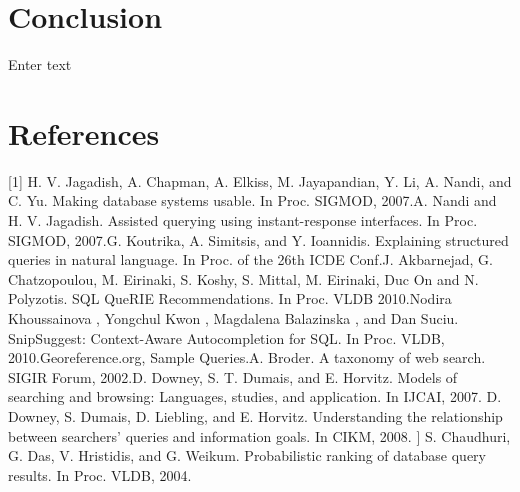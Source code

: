 \documentclass{acm_proc_article-sp}
\begin{document}
\section{Conclusion}
Enter text

\section{References}
[1] H. V. Jagadish, A. Chapman, A. Elkiss, M. Jayapandian, Y. Li, A. Nandi, and C. Yu. Making database systems usable. In Proc. SIGMOD, 2007.\newline
[2] A. Nandi and H. V. Jagadish. Assisted querying using instant-response interfaces. In Proc. SIGMOD, 2007.\newline
[3] G. Koutrika, A. Simitsis, and Y. Ioannidis. Explaining structured queries in natural language. In Proc. of the 26th ICDE Conf.\newline
[4] J. Akbarnejad, G. Chatzopoulou, M. Eirinaki, S. Koshy, S. Mittal, M. Eirinaki, Duc On and N. Polyzotis. SQL QueRIE Recommendations. In Proc. VLDB 2010.\newline
[5] Nodira Khoussainova , Yongchul Kwon , Magdalena Balazinska , and Dan Suciu. SnipSuggest: Context-Aware Autocompletion for SQL. In Proc. VLDB, 2010.\newline
[6] Georeference.org, Sample Queries.\newline
[7] A. Broder. A taxonomy of web search. SIGIR Forum, 2002.\newline
[8] D. Downey, S. T. Dumais, and E. Horvitz. Models of searching and browsing: Languages, studies, and application. In IJCAI, 2007. \newline
[9] D. Downey, S. Dumais, D. Liebling, and E. Horvitz. Understanding the relationship between searchers’ queries and information goals. In CIKM, 2008. \newline
[10] ] S. Chaudhuri, G. Das, V. Hristidis, and G. Weikum. Probabilistic ranking of database query results. In Proc. VLDB, 2004.
\end{document}
